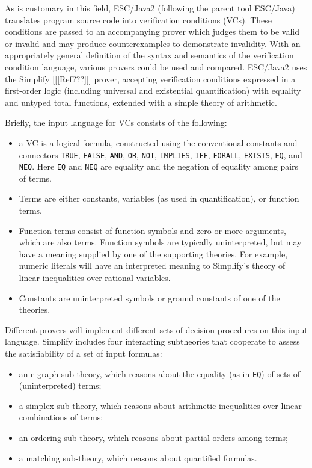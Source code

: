 \documentclass{sig-alternate}
\begin{document}
As is customary in this field, ESC/Java2 (following the parent tool ESC/Java) translates program source code
into verification conditions (VCs).  These conditions are passed to an accompanying prover which
judges them to be valid or invalid and may produce counterexamples to demonstrate
invalidity.  With an appropriately general definition of the syntax and semantics of the verification
condition language, various provers could be used and compared.  ESC/Java2 uses the
Simplify [[[Ref???]]] prover, accepting verification conditions expressed in a
first-order logic (including universal and existential quantification) with equality and untyped total
functions, extended with a simple theory of arithmetic.

Briefly, the input language for VCs consists of the following:
\begin{itemize}
\item a VC is a logical formula, constructed using the conventional constants and connectors
\texttt{TRUE}, \texttt{FALSE}, \texttt{AND}, \texttt{OR}, \texttt{NOT}, \texttt{IMPLIES},
\texttt{IFF}, \texttt{FORALL}, \texttt{EXISTS}, \texttt{EQ}, and \texttt{NEQ}.  Here \texttt{EQ} and
\texttt{NEQ} are equality and the negation of equality among pairs of terms.
\item Terms are either constants, variables (as used in quantification), or function terms.
\item Function terms consist of function symbols and zero or more arguments, which are also
terms.  Function symbols are typically uninterpreted, but may have a meaning supplied by
one of the supporting theories.  For example, numeric literals will have an interpreted meaning
to Simplify's theory of linear inequalities over rational variables.
\item Constants are uninterpreted symbols or ground constants of one of the theories.
\end{itemize}

Different provers will implement different sets of decision procedures on this input language.
Simplify includes four interacting subtheories that cooperate to assess the satisfiability of a 
set of input formulas:
\begin{itemize}
\item an e-graph sub-theory, which reasons about the equality (as in \texttt{EQ}) of sets of
(uninterpreted) terms;
\item a simplex sub-theory, which reasons about arithmetic inequalities over linear combinations
of terms;
\item an ordering sub-theory, which reasons about partial orders among terms;
\item a matching sub-theory, which reasons about quantified formulas.
\end{itemize}
\end{document}
